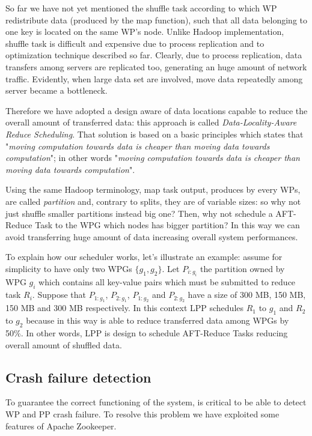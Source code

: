 \documentclass[sigchi]{acmart}
\begin{document}
So far we have not yet mentioned the shuffle task according to which WP redistribute data (produced by the map function), such that all data belonging to one key is located on the same WP's node. Unlike Hadoop implementation, shuffle task is difficult and expensive due to process replication and to optimization technique described so far. Clearly, due to process replication, data transfers among servers are replicated too, generating an huge amount of network traffic. Evidently, when large data set are involved, move data repeatedly among server became a bottleneck. 

Therefore we have adopted a design aware of data locations capable to reduce the overall amount of transferred data: this approach is called \textit{Data-Locality-Aware Reduce Scheduling}. That solution is based on a basic principles which states that "\textit{moving computation towards data is cheaper than moving data towards computation}"; in other words  "\textit{moving computation towards data is cheaper than moving data towards computation}".

Using the same Hadoop terminology, map task output, produces by every WPs, are called \textit{partition} and, contrary to splits, they are of variable sizes: so why not just shuffle smaller partitions instead big one? Then, why not schedule a AFT-Reduce Task to the WPG which nodes has bigger partition? In this way we can avoid transferring huge amount of data increasing overall system performances.

To explain how our scheduler works, let's illustrate an example: assume for simplicity to have only two WPGs $\lbrace g_1, g_2 \rbrace$. Let $P_{i:g_i}$ the partition owned by WPG $g_i$ which contains all key-value pairs which must be submitted to reduce task $R_i$. Suppose that $P_{1:g_1}$, $P_{2:g_1}$, $P_{1:g_2}$ and $P_{2:g_2}$ have a size of 300 MB, 150 MB, 150 MB and 300 MB respectively. In this context LPP schedules $R_1$ to $g_1$ and $R_2$ to $g_2$ because in this way is able to reduce transferred data among WPGs by 50\%. In other words, LPP is design to schedule AFT-Reduce Tasks reducing overall amount of shuffled data.

\subsection{Crash failure detection} To guarantee the correct functioning of the system, is critical to be able to detect WP and PP crash failure. To resolve this problem we have exploited some features of Apache Zookeeper. 
\end{document}
